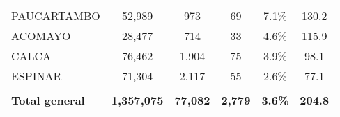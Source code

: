 \begin{tabular}{lccccc}
	\cellcolor[HTML]{FFE699}PAUCARTAMBO                             & 52,989               & 973                        & 69                   & 7.1\%                      & 130.2                                       \\
	\cellcolor[HTML]{FFE699}ACOMAYO                                 & 28,477               & 714                        & 33                   & 4.6\%                      & 115.9                                       \\
	\cellcolor[HTML]{FFE699}CALCA                                   & 76,462               & 1,904                      & 75                   & 3.9\%                      & 98.1                                        \\
	\cellcolor[HTML]{FFE699}ESPINAR                                 & 71,304               & 2,117                      & 55                   & 2.6\%                      & 77.1                                        \\
	& \multicolumn{1}{l}{} & \multicolumn{1}{l}{}       & \multicolumn{1}{l}{} & \multicolumn{1}{l}{}       & \multicolumn{1}{l}{}                        \\
	\rowcolor[HTML]{DDEBF7} 
	\textbf{Total general}                                          & \textbf{1,357,075}   & \textbf{77,082}            & \textbf{2,779}       & \textbf{3.6\%}             & \textbf{204.8}                             
\end{tabular}